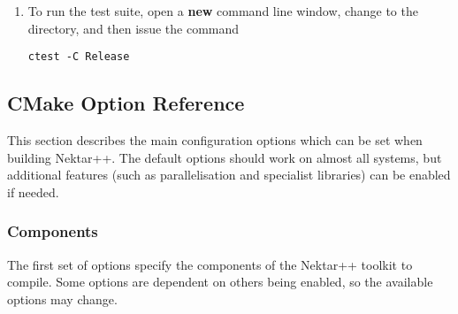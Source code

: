 \begin{enumerate}
{    System Settings}, and in the \emph{Advanced} tab click the \emph{Environment
    Variables}. In the \emph{System Variables} box, select \emph{Path} and click
  \emph{Edit}. To the end of this list, add the \textbf{full paths} to
  directories:
  \begin{itemize}
    \item {}
    \item {}
    \item Optionally, if you installed Boost from the binary packages,
  \end{itemize}
  \item To run the test suite, open a \textbf{new} command line window, change
  to the  directory, and then issue the command
  \begin{lstlisting}[style=BashInputStyle]
    ctest -C Release
  \end{lstlisting}
\end{enumerate}

\subsection{CMake Option Reference}
\label{s:installation:source:cmake}
This section describes the main configuration options which can be set when
building Nektar++. The default options should work on almost all systems, but
additional features (such as parallelisation and specialist libraries) can be
enabled if needed.

\subsubsection{Components}
The first set of options specify the components of the Nektar++ toolkit to
compile. Some options are dependent on others being enabled, so the available
options may change.


